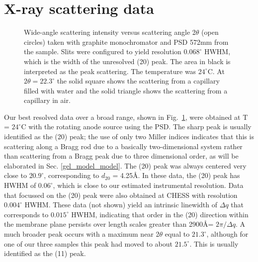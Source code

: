 \section{X-ray scattering data}
\label{gel_model_data}

\begin{figure}[ht]
\centerline {}
\caption{Wide-angle scattering intensity versus scattering angle
2$\theta$ (open circles)
taken with graphite monochromator and PSD 572mm from the sample.
Slits were configured to yield resolution $0.068^{\circ}$ HWHM, which is the
width of the unresolved (20) peak.  The area in black is interpreted
as the peak scattering.  The temperature was $24^{\circ}$C.
At $2 \theta = 22.3^{\circ}$ the solid square shows the scattering
from a capillary filled with water and the solid triangle shows the
scattering from a capillary in air.
\label{model:fig1}}
\end{figure}

Our best resolved data over a broad range, shown in Fig.\ \ref{model:fig1}, 
were obtained at T = $24^{\circ}$C with the rotating anode source using 
the PSD. The sharp peak is usually identified 
as the (20) peak; the use of only two Miller indices indicates that this
is scattering along a Bragg rod due to a basically two-dimensional system
rather than scattering from a Bragg peak due to three dimensional order,
as will be elaborated in Sec. \ref{gel_model_model}.
The (20) peak was always centered very close to $20.9^{\circ}$,
corresponding to $d_{20}$ = 4.25\AA . In these data, the (20) peak has HWHM of 
$0.06^{\circ}$, which is close to our estimated instrumental resolution.  
Data that focussed on the (20) peak were also obtained at CHESS with resolution
$0.004^{\circ}$ HWHM.  These data (not shown) yield an intrinsic linewidth of 
$\Delta q$ that corresponds to $0.015^{\circ}$ HWHM, indicating that order in the 
(20) direction within the membrane plane persists over length scales greater
than 2900\AA = $2{\pi}/\Delta q$.  A much broader peak occurs with a maximum 
near 2$\theta$ equal to $21.3^{\circ}$, although for one of our three samples this peak
had moved to about $21.5^{\circ}$.  This is usually identified as the (11) peak.

